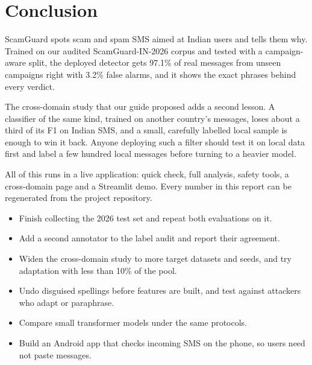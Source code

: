 \chapter{Conclusion}
ScamGuard spots scam and spam SMS aimed at Indian users and tells them why. Trained on our audited ScamGuard-IN-2026 corpus and tested with a campaign-aware split, the deployed detector gets 97.1\% of real messages from unseen campaigns right with 3.2\% false alarms, and it shows the exact phrases behind every verdict.

The cross-domain study that our guide proposed adds a second lesson. A classifier of the same kind, trained on another country's messages, loses about a third of its F1 on Indian SMS, and a small, carefully labelled local sample is enough to win it back. Anyone deploying such a filter should test it on local data first and label a few hundred local messages before turning to a heavier model.

All of this runs in a live application: quick check, full analysis, safety tools, a cross-domain page and a Streamlit demo. Every number in this report can be regenerated from the project repository.

\vspace{6pt}
\begin{itemize}
\item Finish collecting the 2026 test set and repeat both evaluations on it.
\item Add a second annotator to the label audit and report their agreement.
\item Widen the cross-domain study to more target datasets and seeds, and try adaptation with less than 10\% of the pool.
\item Undo disguised spellings before features are built, and test against attackers who adapt or paraphrase.
\item Compare small transformer models under the same protocols.
\item Build an Android app that checks incoming SMS on the phone, so users need not paste messages.
\end{itemize}
